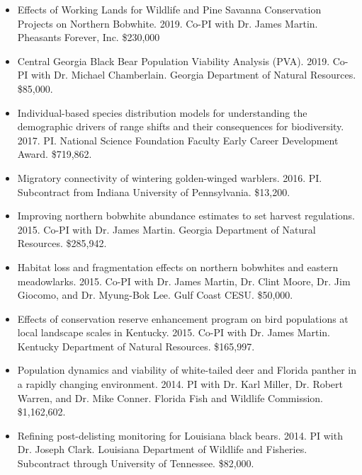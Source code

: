 \begin{itemize}

\item Effects of Working Lands for Wildlife and Pine Savanna
  Conservation Projects on Northern Bobwhite. 2019. Co-PI with
  Dr. James Martin. Pheasants Forever, Inc. \$230,000

\item Central Georgia Black Bear Population Viability Analysis
  (PVA). 2019. Co-PI with Dr. Michael Chamberlain. Georgia Department
  of Natural Resources. \$85,000. 
  
\item Individual-based species distribution models for
  understanding the demographic drivers of range shifts and their
  consequences for biodiversity. 2017. PI. National Science
  Foundation Faculty Early Career Development Award. \$719,862. 

\item Migratory connectivity of wintering golden-winged
  warblers. 2016. PI. Subcontract from Indiana University of
  Pennsylvania. \$13,200. 

\item Improving northern bobwhite abundance estimates to set harvest
  regulations. 2015. Co-PI with Dr. James Martin. Georgia Department of
  Natural Resources. \$285,942.


\item Habitat loss and fragmentation effects on northern bobwhites and
  eastern meadowlarks. 2015. Co-PI with Dr. James Martin, Dr. Clint Moore,
  Dr. Jim Giocomo, and Dr. Myung-Bok Lee. Gulf Coast CESU. \$50,000. 

\item Effects of conservation reserve enhancement program on bird
  populations at local landscape scales in Kentucky. 2015. Co-PI with
  Dr. James Martin. Kentucky Department of Natural Resources. \$165,997.

\item Population dynamics and viability of white-tailed deer and
  Florida panther in a rapidly changing environment. 2014. PI with Dr. Karl
  Miller, Dr. Robert Warren, and Dr. Mike Conner. Florida
  Fish and Wildlife Commission. \$1,162,602. 

\item Refining post-delisting monitoring for Louisiana black
  bears. 2014. PI with Dr. Joseph Clark. Louisiana Department of Wildlife and
  Fisheries. Subcontract through University of Tennessee. \$82,000. 


\end{itemize}
